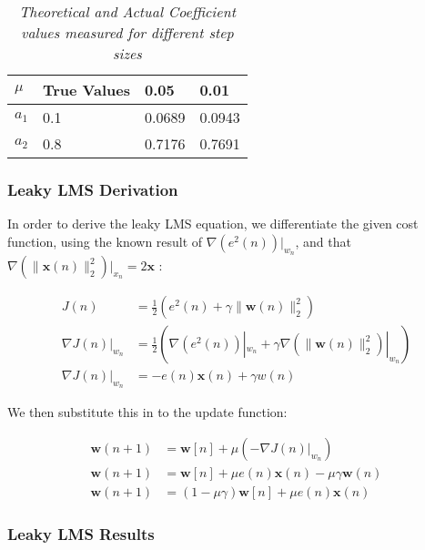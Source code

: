 \documentclass[./main.tex]{subfiles}
\begin{document}
\begin{table}[h]
\centering
\begin{tabular}{|l|l|l|l|}
\hline
$\mu$ & True Values & 0.05   & 0.01   \\ \hline
$a_1$ & 0.1               & 0.0689 & 0.0943 \\ \hline
$a_2$ & 0.8               & 0.7176 & 0.7691 \\ \hline
\end{tabular}
\caption{\textit{Theoretical and Actual Coefficient values measured for different step sizes}}
\label{tab:3_1_d}
\end{table}

\subsubsection{Leaky LMS Derivation}
In order to derive the leaky LMS equation, we differentiate the given cost function, using the known result of $ \nabla ( e^2(n) ) |_{w_n}$, and that $ \nabla (\lVert \mathbf{x}(n)\rVert_2^2 )|_{x_n} = 2\mathbf{x} $ \cite{Berger2007}  :

\begin{subequations}
\begin{align}
J(n) &= \frac{1}{2} ( e^2(n) + \gamma \lVert \mathbf{w}(n) \rVert_2^2 ) \\
\nabla J(n)|_{w_n} &= \frac{1}{2}  ( \nabla ( e^2(n) ) |_{w_n} + \gamma \nabla (\lVert \mathbf{w}(n)\rVert_2^2 )|_{w_n} ) \\
\nabla J(n)|_{w_n} &= -e(n) \mathbf{x}(n) + \gamma w(n)
\end{align}
\end{subequations}

We then substitute this in to the update function:

\begin{subequations}
\begin{align}
\mathbf{w}(n+1) &= \mathbf{w}[n] + \mu (- \nabla J(n)|_{w_n}) \\
\mathbf{w}(n+1) &= \mathbf{w}[n] + \mu e(n) \mathbf{x}(n) - \mu \gamma \mathbf{w}(n) \\
\mathbf{w}(n+1) &= (1 - \mu \gamma ) \mathbf{w}[n] + \mu e(n) \mathbf{x}(n)
\end{align}
\end{subequations}



\subsubsection{Leaky LMS Results}
\end{document}
